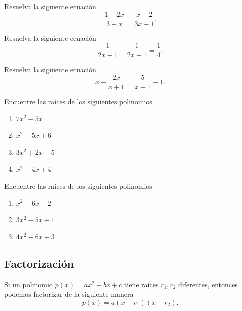 	\begin{problema} Resuelva la siguiente ecuaci\'on
		$$
		\dfrac{1-2x}{3-x}=\dfrac{x-2}{3x-1}.
		$$
	\end{problema}
	



	\begin{problema} Resuelva la siguiente ecuaci\'on
		$$
		\dfrac{1}{2x-1}-\dfrac{1}{2x+1}=\dfrac{1}{4}.
		$$
	\end{problema}
	



	\begin{problema} Resuelva la siguiente ecuaci\'on
		$$
		x-\dfrac{2x}{x+1}=\dfrac{5}{x+1}-1.
		$$
	\end{problema}
	



	\begin{problema}
		\label{spi:exmp:16.2}
		Encuentre las ra\'ices de los siguientes polinomios
		\begin{enumerate}
			\item $7x^{2}-5x$
			\item $x^{2}-5x+6$
			\item $3x^{2}+2x-5$
			\item $x^{2}-4x+4$
		\end{enumerate}
		
	\end{problema}
	
	



	\begin{problema}
		\label{spi:exmp:16.3-}
		Encuentre las ra\'ices de los siguientes polinomios
		\begin{enumerate}
			\item $x^{2}-6x-2$
			\item $3x^2-5x+1$
			\item $4x^{2}-6x+3$   
		\end{enumerate}
		
	\end{problema}


\subsection{Factorizaci\'on}


	Si un polinomio $p(x)=ax^{2}+bx+c$ tiene ra\'ices $r_{1},r_{2}$ diferentes, entonces podemos factorizar de la siguiente manera
	$$
	p(x)=a(x-r_{1})\left( x-r_{2} \right).
	$$



